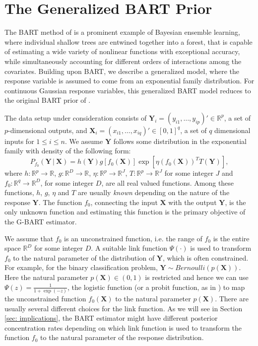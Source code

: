 \documentclass[12pt]{article}
\newcommand{\bm}[1]{\boldsymbol{#1}}
\newcommand{\Y}{\bm{Y}}
\newcommand{\1}{\mathbb{I}}
\def\C {\,|\:}
\def\C {\,|\:}
\def\Y{\bm{Y}}
\def\X{\bm{X}}
\def\C{\mbox{\boldmath$C$}}
\def\X{\mbox{\boldmath$X$}}
\renewcommand{\Y}{\bm{Y}}
\def\C {\,|\:}
\def\C {\,|\:}
\def\X{\bm{X}}
\theoremstyle{plain}
\theoremstyle{definition}
\theoremstyle{remark}
\begin{document}
\section{The Generalized BART Prior}\label{sec:G-BART}
The BART method of \cite{chipman2010bart} is a prominent example of Bayesian ensemble learning, where individual shallow trees are entwined together into a forest, that is capable of estimating a wide variety of nonlinear functions with exceptional accuracy, while simultaneously accounting for different orders of interactions among the covariates.
Building upon BART, we describe a generalized model, where the response variable is assumed to come from an exponential family distribution. For continuous Gaussian response variables, this generalized BART model reduces to the original BART prior of \citep{chipman2010bart}.

The data setup under consideration consists of  $\Y_i = (y_{i1} , \dots , y_{ip} )' \in \mathbb{R}^p$, a set of $p$-dimensional outputs, and $ \X_i = (x_{i1} , \dots , x_{iq} )' \in [0,1]^q $,  a set of $q$ dimensional inputs for $1\leq i\leq n$.  We assume $\Y$ follows some distribution in the exponential family with density of the following form:
    \begin{equation}\label{eq:exponential_pdf}
        P_{f_0}(\Y \C \X)=h(\Y)g\left[f_0(\X)\right]\exp \left [\eta \left (f_0(\X) \right)^T T(\Y) \right],
    \end{equation}
where $h: \mathbb{R}^p \rightarrow \mathbb{R}$, $g: \mathbb{R}^D \rightarrow \mathbb{R}$, $\eta: \mathbb{R}^p \rightarrow \mathbb{R}^J$, $T: \mathbb{R}^p \rightarrow \mathbb{R}^J$ for some integer $J$ and $f_0: \mathbb{R}^q \rightarrow \mathbb{R}^D$, for some integer $D$, are all real valued functions. Among these functions, $h$, $g$, $\eta$ and $T$ are usually {\it known} depending on the nature of the response $\Y$. The function $f_0$, connecting the input $\X$ with the output $\Y$, is the only unknown function and estimating this function is the primary objective of the G-BART estimator. 

We assume that $f_0$ is an unconstrained function, i.e. the range of $f_0$ is the entire space $\mathbb{R}^D$ for some integer $D$. A suitable link function $\Psi(\cdot)$ is used to transform $f_0$ to the natural parameter of the distribution of $\Y$, which is often constrained. For example, for the binary classification problem, $\Y \sim Bernoulli\left (p(\X) \right)$. Here the natural parameter $p(\X) \in (0,1)$ is restricted and hence we can use $\Psi(z) = \frac{1}{1+\exp(-z)}$, the logistic function (or a probit function, as in \cite{chipman2010bart}) to map the unconstrained function $f_0(\X)$ to the natural parameter $p(\X)$. There are usually several different choices for the link function. As we will see in Section \ref{sec: implications}, the BART estimator might have different posterior concentration rates depending on which link function is used to transform the function $f_0$ to the natural parameter of the response distribution.
\end{document}

